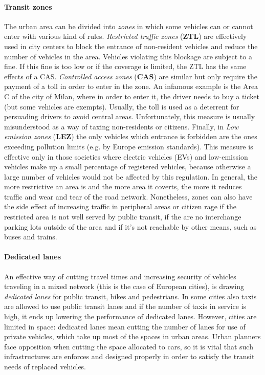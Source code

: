 \paragraph{Transit zones}

The urban area can be divided into \textit{zones} in which some vehicles can or cannot enter with various kind of rules.
\textit{Restricted traffic zones} (\textbf{ZTL}) are effectively used in city centers to block the entrance of non-resident vehicles and reduce the number of vehicles in the area. Vehicles violating this blockage are subject to a fine. If this fine is too low or if the coverage is limited, the ZTL has the same effects of a CAS.
\textit{Controlled access zones} (\textbf{CAS}) are similar but only require the payment of a toll in order to enter in the zone. An infamous example is the Area C of the city of Milan, where in order to enter it, the driver needs to buy a ticket (but some vehicles are exempts). Usually, the toll is used as a deterrent for persuading drivers to avoid central areas. Unfortunately, this measure is usually misunderstood as a way of taxing non-residents or citizens.
Finally, in \textit{Low emission zones} (\textbf{LEZ}) the only vehicles which entrance is forbidden are the ones exceeding pollution limits (e.g. by Europe emission standards). This measure is effective only in those societies where electric vehicles (EVs) and low-emission vehicles make up a small percentage of registered vehicles, because otherwise a large number of vehicles would not be affected by this regulation.
In general, the more restrictive an area is and the more area it coverts, the more it reduces traffic and wear and tear of the road network. Nonetheless, zones can also have the side effect of increasing traffic in peripheral areas or citizen rage if the restricted area is not well served by public transit, if the are no interchange parking lots outside of the area and if it's not reachable by other means, such as buses and trains.

\paragraph{Dedicated lanes}

An effective way of cutting travel times and increasing security of vehicles traveling in a mixed network (this is the case of European cities), is drawing \textit{dedicated lanes} for public transit, bikes and pedestrians. In some cities also taxis are allowed to use public transit lanes and if the number of taxis in service is high, it ends up lowering the performance of dedicated lanes. However, cities are limited in space: dedicated lanes mean cutting the number of lanes for use of private vehicles, which take up most of the spaces in urban areas. Urban planners face opposition when cutting the space allocated to cars, so it is vital that such infrastructures are enforces and designed properly in order to satisfy the transit needs of replaced vehicles.


